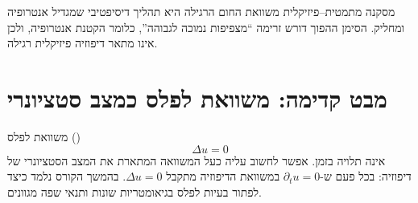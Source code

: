 \begin{resultbox}{מסקנה מתמטית–פיזיקלית}
משוואת החום הרגילה היא תהליך דיסיפטיבי שמגדיל אנטרופיה ומחליק.
הסימן ההפוך דורש זרימה ``מצפיפות נמוכה לגבוהה'', כלומר הקטנת אנטרופיה, ולכן אינו מתאר דיפוזיה פיזיקלית רגילה.
\end{resultbox}

\section{מבט קדימה: משוואת לפלס כמצב סטציונרי}
משוואת לפלס ()
\[
\Delta u=0
\]
אינה תלויה בזמן.
אפשר לחשוב עליה כעל המשוואה המתארת את המצב הסטציונרי של דיפוזיה:
בכל פעם ש-\(\partial_t u=0\) במשוואת הדיפוזיה מתקבל \(\Delta u=0\).
בהמשך הקורס נלמד כיצד לפתור בעיות לפלס בגיאומטריות שונות ותנאי שפה מגוונים.

